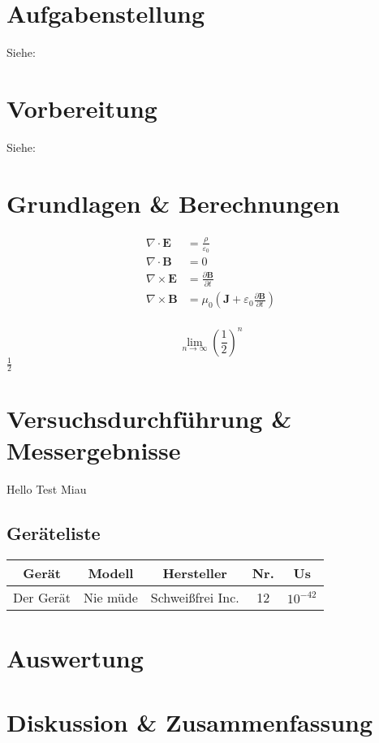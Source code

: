 \documentclass[11pt]{scrartcl}
\begin{document}
\tableofcontents
\newpage

\section{Aufgabenstellung\label{Auf0}}

Siehe:

\section{Vorbereitung}

Siehe:

\section{Grundlagen \& Berechnungen}
\begin{align}
    \nabla \cdot \textbf{E}  & = \frac{\rho}{\varepsilon_0}                                                              \\
    \nabla \cdot \textbf{B}  & = 0                                                                                       \\
    \nabla \times \textbf{E} & = \frac{\partial \textbf{B}}{\partial t}                                                  \\
    \nabla \times \textbf{B} & = \mu_{0}\left(\textbf{J} + \varepsilon_{0} \frac{\partial \textbf{B}}{\partial t}\right) \\
\end{align}

$$\lim_{n\to\infty} (\frac{1}{2})^n$$
$\frac{1}{2}$
\section{Versuchsdurchführung \& Messergebnisse}
Hello Test Miau
\subsection{Geräteliste}
\begin{center}
    \begin{tabular}{|c|c|c|c|c|} \hline
        \textbf{Gerät} & \textbf{Modell} & \textbf{Hersteller} & \textbf{Nr.} & \textbf{Us} \\ \hline
        Der Gerät      & Nie müde        & Schweißfrei Inc.    & 12           & $10^{-42}$  \\ \hline
    \end{tabular}
\end{center}

\section{Auswertung}

\section{Diskussion \& Zusammenfassung}

\end{document}
